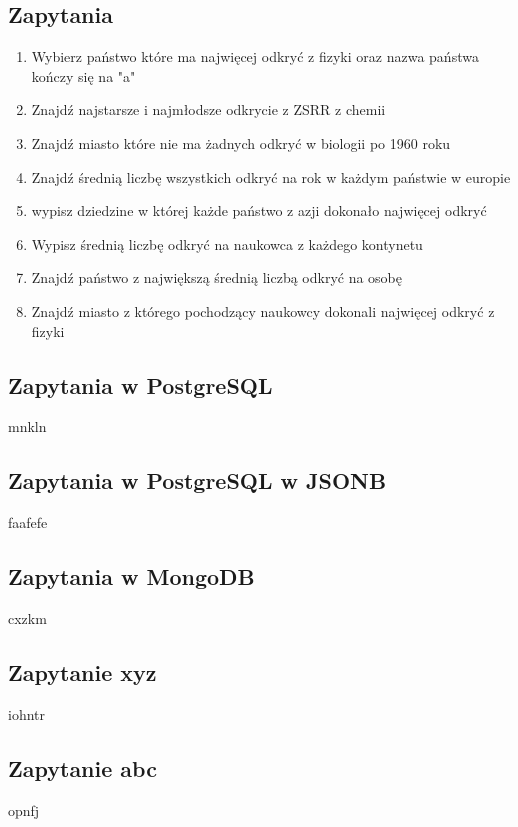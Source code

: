 \documentclass[11pt]{article}
\begin{document}
	\subsection{Zapytania}
		\begin{enumerate}
			\item Wybierz państwo które ma najwięcej odkryć z fizyki oraz nazwa państwa kończy się na "a"
			\item Znajdź najstarsze i najmłodsze odkrycie z ZSRR z chemii
			\item Znajdź miasto które nie ma żadnych odkryć w biologii po 1960 roku
			\item Znajdź średnią liczbę wszystkich odkryć na rok w każdym państwie w europie
			\item wypisz dziedzine w której każde państwo z azji dokonało najwięcej odkryć
			\item Wypisz średnią liczbę odkryć na naukowca z każdego kontynetu
			\item Znajdź państwo z największą średnią liczbą odkryć na osobę
			\item Znajdź miasto z którego pochodzący naukowcy dokonali najwięcej odkryć z fizyki
		\end{enumerate}
	\subsection{Zapytania w PostgreSQL}
		mnkln
	\subsection{Zapytania w PostgreSQL w JSONB}
		faafefe
	\subsection{Zapytania w MongoDB}
		cxzkm
	\subsection{Zapytanie xyz}
		iohntr
	\subsection{Zapytanie abc}
		opnfj
\end{document}
